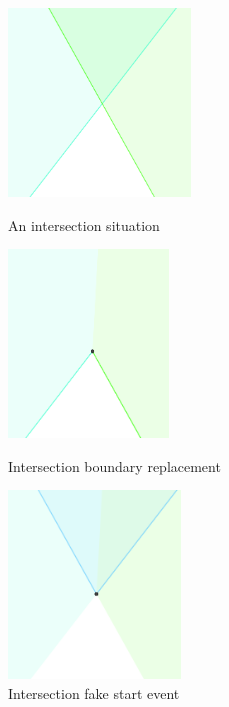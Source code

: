 \documentclass[12pt]{article}
\begin{document}
\begin{figure}[H]
    \centering
    \includegraphics[height=5cm]{Images/intersection_intersect.png}
    \caption{An intersection situation}
    \label{fig:intersectionIntersection}
    \endminipage\hfill
    \centering
    \includegraphics[height=5cm]{Images/intersection_intersectOldBoundaryCut.png}
    \caption{Intersection boundary replacement}
    \label{fig:intersectionIntersectionOldBoundary}
    \endminipage\hfill
    \centering
    \includegraphics[height=5cm]{Images/intersection_intersectNewStartEvent.png}
    \caption{Intersection fake start event}
    \label{fig:intersectionIntersectionNewStartEvent}
    \endminipage
\end{figure}
\end{document}
